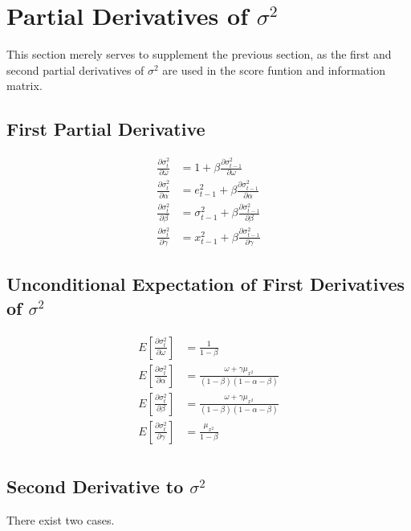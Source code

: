 \documentclass{article}
\begin{document}
\section{Partial Derivatives of $\sigma^2$}
This section merely serves to supplement the previous section, as the first and second partial derivatives of $\sigma^2$ are used in the score funtion and information matrix. 

\subsection{First Partial Derivative}
\begin{align}
    \frac{\partial \sigma_{t}^2}{\partial \omega} &= 1 + \beta \frac{\partial \sigma_{t-1}^2}{\partial \omega} \\
    \frac{\partial \sigma_{t}^2}{\partial \alpha} &= e_{t-1}^2 + \beta \frac{\partial \sigma_{t-1}^2}{\partial \alpha} \\
    \frac{\partial \sigma_{t}^2}{\partial \beta} &= \sigma_{t-1}^2 + \beta \frac{\partial \sigma_{t-1}^2}{\partial \beta} \\
    \frac{\partial \sigma_{t}^2}{\partial \gamma} &= x_{t-1}^2 + \beta \frac{\partial \sigma_{t-1}^2}{\partial \gamma}
\end{align}

\subsection{Unconditional Expectation of First Derivatives of $\sigma^2$}
\begin{align}
    E\left[\frac{\partial \sigma_{t}^2}{\partial \omega}\right] &= \frac{1}{1-\beta} \\
    E\left[\frac{\partial \sigma_{t}^2}{\partial \alpha}\right] &= \frac{\omega + \gamma \mu_{x^2}}{(1-\beta)(1-\alpha-\beta)} \\
    E\left[\frac{\partial \sigma_{t}^2}{\partial \beta}\right] &= \frac{\omega + \gamma \mu_{x^2}}{(1-\beta)(1-\alpha-\beta)} \\
    E\left[\frac{\partial \sigma_{t}^2}{\partial \gamma}\right] &= \frac{\mu_{x^2}}{1-\beta} \\
\end{align}

\subsection{Second Derivative to $\sigma^2$}
There exist two cases. 
\end{document}
